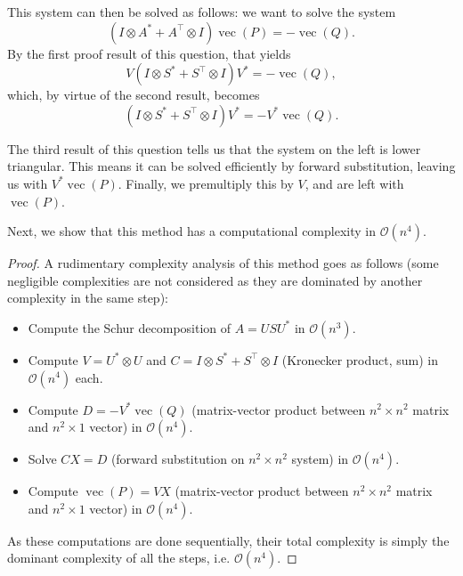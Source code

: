 \documentclass[11pt]{article}
\newcommand{\kp}{\otimes}
\DeclareMathOperator{\vect}{vec}
\newcommand{\bo}{\mathcal{O}}
\begin{document}
This system can then be solved as follows: we want to solve the system
\[
(I \kp A^* + A^\top \kp I) \vect(P) = -\vect(Q).
\]
By the first proof result of this question, that yields
\[
V (I \kp S^* + S^\top \kp I) V^* = -\vect(Q),
\]
which, by virtue of the second result, becomes
\[
(I \kp S^* + S^\top \kp I) V^* = - V^*\vect(Q).
\]

The third result of this question tells us that the system on the left is lower triangular.
This means it can be solved efficiently by forward substitution, leaving us with \(V^* \vect(P)\).
Finally, we premultiply this by \(V\), and are left with \(\vect(P)\).

Next, we show that this method has a computational complexity in \(\bo(n^4)\).
\begin{proof}
A rudimentary complexity analysis of this method goes as follows (some negligible complexities are not considered as they are dominated by another complexity in the same step):
\begin{itemize}
	\item Compute the Schur decomposition of \(A = U S U^*\) in \(\bo(n^3)\).
	\item Compute \(V = U^* \kp U\) and \(C = I \kp S^* + S^\top \kp I\) (Kronecker product, sum) in \(\bo(n^4)\) each.
	\item Compute \(D = -V^* \vect(Q)\) (matrix-vector product between \(n^2 \times n^2\) matrix and \(n^2 \times 1\) vector) in \(\bo(n^4)\).
	\item Solve \(C X = D\) (forward substitution on \(n^2 \times n^2\) system) in \(\bo(n^4)\).
	\item Compute \(\vect(P) = VX\) (matrix-vector product between \(n^2 \times n^2\) matrix and \(n^2 \times 1\) vector) in \(\bo(n^4)\).
\end{itemize}
As these computations are done sequentially, their total complexity is simply the dominant complexity of all the steps, i.e. \(\bo(n^4)\).
\end{proof}
\end{document}
